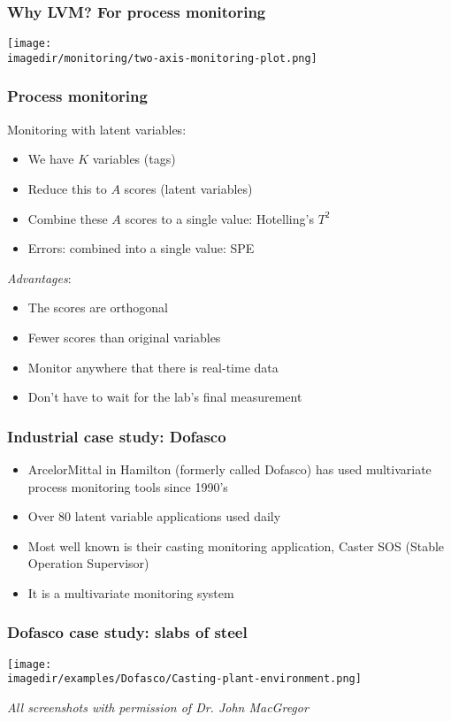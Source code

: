 \begin{frame}\frametitle{Why LVM? For process monitoring}

	\texttt{[image: \\imagedir/monitoring/two-axis-monitoring-plot.png]}
\end{frame}

\begin{frame}\frametitle{Process monitoring}

	Monitoring with latent variables:
	\begin{itemize}
		\item	We have $K$ variables (tags)
		\item	Reduce this to $A$ scores (latent variables)
		\item	Combine these $A$ scores to a single value: Hotelling's $T^2$
		\item	Errors: combined into a single value: SPE
	\end{itemize}

	\emph{Advantages}:
	\begin{itemize}
		\item	The scores are orthogonal
		\item	Fewer scores than original variables
		\item	Monitor anywhere that there is real-time data
		\item	Don't have to wait for the lab's final measurement
	\end{itemize}
\end{frame}

\begin{frame}\frametitle{Industrial case study: Dofasco}
	\begin{itemize}
		\item	ArcelorMittal in Hamilton (formerly called Dofasco) has used multivariate process monitoring tools since 1990's
		\item	Over 80 latent variable applications used daily
		\item	Most well known is their casting monitoring application, Caster SOS (Stable Operation Supervisor)
		\item	It is a multivariate monitoring system
	\end{itemize}
\end{frame}

\begin{frame}\frametitle{Dofasco case study: slabs of steel}

	\texttt{[image: \\imagedir/examples/Dofasco/Casting-plant-environment.png]}

	\emph{All screenshots with permission of Dr. John MacGregor}
\end{frame}

